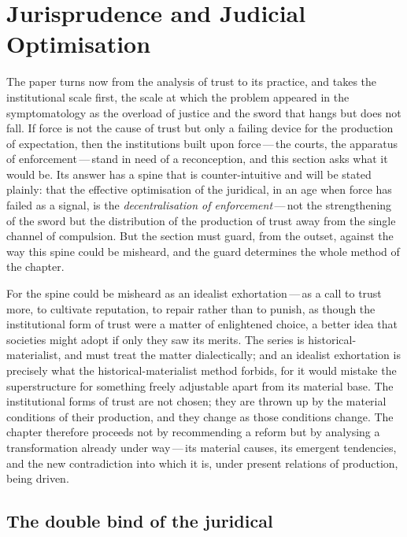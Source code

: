 \section{Jurisprudence and Judicial Optimisation}
\label{p13:sec:judicial}

\noindent
The paper turns now from the analysis of trust to its practice, and takes the institutional scale first, the scale at which the problem appeared in the symptomatology as the overload of justice and the sword that hangs but does not fall. If force is not the cause of trust but only a failing device for the production of expectation, then the institutions built upon force\,---\,the courts, the apparatus of enforcement\,---\,stand in need of a reconception, and this section asks what it would be. Its answer has a spine that is counter-intuitive and will be stated plainly: that the effective optimisation of the juridical, in an age when force has failed as a signal, is the \emph{decentralisation of enforcement}\,---\,not the strengthening of the sword but the distribution of the production of trust away from the single channel of compulsion. But the section must guard, from the outset, against the way this spine could be misheard, and the guard determines the whole method of the chapter.

For the spine could be misheard as an idealist exhortation\,---\,as a call to trust more, to cultivate reputation, to repair rather than to punish, as though the institutional form of trust were a matter of enlightened choice, a better idea that societies might adopt if only they saw its merits. The series is historical-materialist, and must treat the matter dialectically; and an idealist exhortation is precisely what the historical-materialist method forbids, for it would mistake the superstructure for something freely adjustable apart from its material base. The institutional forms of trust are not chosen; they are thrown up by the material conditions of their production, and they change as those conditions change. The chapter therefore proceeds not by recommending a reform but by analysing a transformation already under way\,---\,its material causes, its emergent tendencies, and the new contradiction into which it is, under present relations of production, being driven.

\subsection{The double bind of the juridical}
\label{p13:sub:jud-doublebind}

